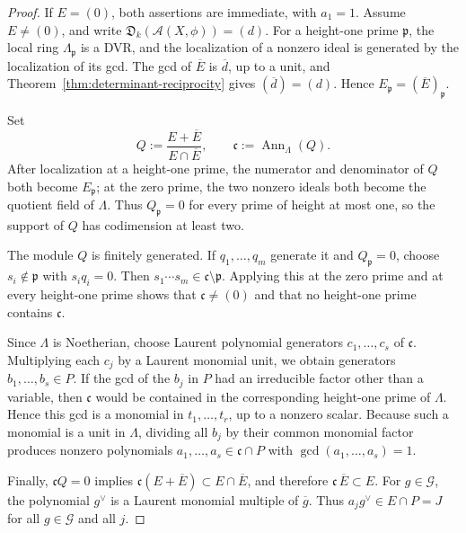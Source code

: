\documentclass{article}
\theoremstyle{definition}
\theoremstyle{plain}
\DeclareMathOperator{\gcdop}{gcd}
\begin{document}
\begin{proof}
If \(E=(0)\), both assertions are immediate, with \(a_1=1\).  Assume
\(E\ne(0)\), and write
\(\mathfrak D_k(\mathcal A(X,\phi))=(d)\).  For a height-one prime
\(\mathfrak p\), the local ring \(\Lambda_{\mathfrak p}\) is a DVR, and
the localization of a nonzero ideal is generated by the localization of
its gcd.  The gcd of \(\overline E\) is \(\overline d\), up to a unit, and
Theorem~\ref{thm:determinant-reciprocity} gives
\((\overline d)=(d)\).  Hence
\(E_{\mathfrak p}=(\overline{E})_{\mathfrak p}\).

Set
\[
 Q:=\frac{E+\overline E}{E\cap\overline E},
 \qquad
 \mathfrak c:=\operatorname{Ann}_{\Lambda}(Q).
\]
After localization at a height-one prime, the numerator and denominator
of \(Q\) both become \(E_{\mathfrak p}\); at the zero prime, the two
nonzero ideals both become the quotient field of \(\Lambda\).  Thus
\(Q_{\mathfrak p}=0\) for every prime of height at most one, so the support
of \(Q\) has codimension at least two.

The module \(Q\) is finitely generated.  If \(q_1,\dots,q_m\) generate
it and \(Q_{\mathfrak p}=0\), choose
\(s_i\notin\mathfrak p\) with \(s_i q_i=0\).  Then
\(s_1\cdots s_m\in\mathfrak c\setminus\mathfrak p\).  Applying this at
the zero prime and at every height-one prime shows that
\(\mathfrak c\ne(0)\) and that no height-one prime contains
\(\mathfrak c\).

Since \(\Lambda\) is Noetherian, choose Laurent polynomial generators
\(c_1,\dots,c_s\) of \(\mathfrak c\).  Multiplying each \(c_j\) by a
Laurent monomial unit, we obtain generators \(b_1,\dots,b_s\in P\).  If the
gcd of the \(b_j\) in \(P\) had an irreducible factor other than a
variable, then \(\mathfrak c\) would be contained in the corresponding
height-one prime of \(\Lambda\).  Hence this gcd is a monomial in \(t_1,\dots,t_r\), up to a nonzero
scalar.  Because such a monomial is a unit in \(\Lambda\), dividing all
\(b_j\) by their common monomial factor produces nonzero polynomials
\(a_1,\dots,a_s\in\mathfrak c\cap P\) with
\(\gcdop(a_1,\dots,a_s)=1\).

Finally, \(\mathfrak cQ=0\) implies
\(\mathfrak c(E+\overline E)\subset E\cap\overline E\), and therefore
\(\mathfrak c\,\overline E\subset E\).  For \(g\in\mathcal G\), the
polynomial \(g^\vee\) is a Laurent monomial multiple of \(\overline g\).
Thus \(a_j g^\vee\in E\cap P=J\) for all \(g\in\mathcal G\) and all
\(j\).
\end{proof}
\end{document}

